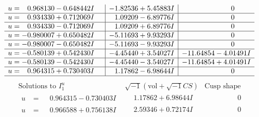 \documentclass[1p]{elsarticle_modified}
\theoremstyle{definition}
\newcommand{\I}{\sqrt{-1}}
\begin{document}
$$\begin{array}{c|c|c}
\begin{aligned}
u &= \phantom{-}0.968130 - 0.648442 I\end{aligned}
 & -1.82536 + 5.45883 I & \phantom{-0.000000 } 0 \\ \hline\begin{aligned}
u &= \phantom{-}0.934330 + 0.712069 I\end{aligned}
 & \phantom{-}1.09209 - 6.89776 I & \phantom{-0.000000 } 0 \\ \hline\begin{aligned}
u &= \phantom{-}0.934330 - 0.712069 I\end{aligned}
 & \phantom{-}1.09209 + 6.89776 I & \phantom{-0.000000 } 0 \\ \hline\begin{aligned}
u &= -0.980007 + 0.650482 I\end{aligned}
 & -5.11693 + 9.93293 I & \phantom{-0.000000 } 0 \\ \hline\begin{aligned}
u &= -0.980007 - 0.650482 I\end{aligned}
 & -5.11693 - 9.93293 I & \phantom{-0.000000 } 0 \\ \hline\begin{aligned}
u &= -0.580139 + 0.542430 I\end{aligned}
 & -4.45440 + 3.54027 I & -11.64854 - 4.01491 I \\ \hline\begin{aligned}
u &= -0.580139 - 0.542430 I\end{aligned}
 & -4.45440 - 3.54027 I & -11.64854 + 4.01491 I \\ \hline\begin{aligned}
u &= \phantom{-}0.964315 + 0.730403 I\end{aligned}
 & \phantom{-}1.17862 - 6.98644 I & \phantom{-0.000000 } 0\\
 \hline 
 \end{array}$$\newpage$$\begin{array}{c|c|c}  
\text{Solutions to }I^u_{1}& \I (\text{vol} + \sqrt{-1}CS) & \text{Cusp shape}\\
 \hline 
\begin{aligned}
u &= \phantom{-}0.964315 - 0.730403 I\end{aligned}
 & \phantom{-}1.17862 + 6.98644 I & \phantom{-0.000000 } 0 \\ \hline\begin{aligned}
u &= \phantom{-}0.966588 + 0.756138 I\end{aligned}
 & \phantom{-}2.59346 + 0.72174 I & \phantom{-0.000000 } 0 \\ \hline\begin{aligned}

\end{aligned}
\end{array}$$
\end{document}
